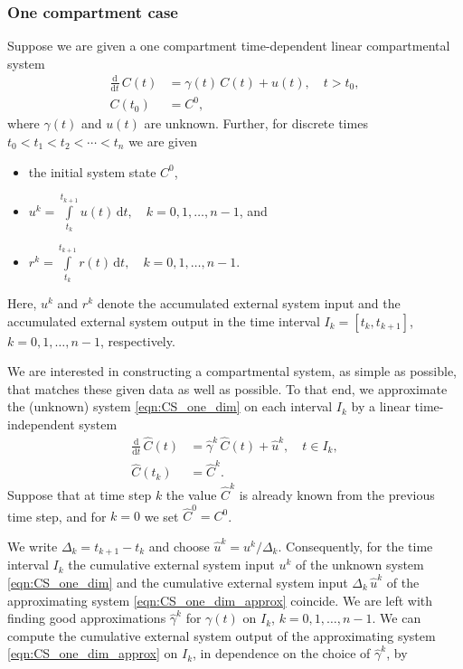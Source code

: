 \documentclass[draft]{agujournal2019}
\newcommand{\deriv}[1]{\frac{\mathrm{d}}{\mathrm{d}#1}}
\newcommand{\dd}[1]{\,\mathrm{d}#1}
\newcommand{\intl}{\int\limits}
\begin{document}
    \subsubsection{One compartment case}
        Suppose we are given a one compartment time-dependent linear compartmental system
        \begin{equation}\label{eqn:CS_one_dim}
            \begin{aligned}
                \deriv{t}\,C(t) &= \gamma(t)\,C(t) + u(t),\quad t>t_0,\\
                C(t_0) &= C^0,
            \end{aligned}
        \end{equation}
        where $\gamma(t)$ and $u(t)$ are unknown.
        Further, for discrete times $t_0<t_1<t_2<\cdots<t_n$ we are given
        \begin{itemize}
            \item the initial system state $C^0$,
            \item $u^k = \intl_{t_k}^{t_{k+1}} u(t)\dd{t},\quad k=0,1,\ldots,n-1$, and
            \item $r^k = \intl_{t_k}^{t_{k+1}} r(t)\dd{t},\quad k=0,1,\ldots,n-1$.
        \end{itemize}
        Here, $u^k$ and $r^k$ denote the accumulated external system input and the accumulated external system output in the time interval $I_k=[t_k,t_{k+1}]$, $k=0,1,\ldots,n-1$, respectively.

        We are interested in constructing a compartmental system, as simple as possible, that matches these given data as well as possible.
        To that end, we approximate the (unknown) system \eqref{eqn:CS_one_dim} on each interval $I_k$ by a linear time-independent system
        \begin{equation}\label{eqn:CS_one_dim_approx}
            \begin{aligned}
                \deriv{t}\,\widehat{C}(t) &= \widehat{\gamma}^k\,\widehat{C}(t) + \widehat{u}^k,\quad t\in I_k,\\
                \widehat{C}(t_k) &= \widehat{C}^k.
            \end{aligned}
        \end{equation}
        Suppose that at time step $k$ the value $\widehat{C}^k$ is already known from the previous time step,
        and for $k=0$ we set $\widehat{C}^0=C^0$.
        
        We write $\Delta_k=t_{k+1}-t_k$ and choose $\widehat{u}^k=u^k/\Delta_k$.
        Consequently, for the time interval $I_k$ the cumulative external system input $u^k$ of the unknown system \eqref{eqn:CS_one_dim} and the cumulative external system input $\Delta_k\,\widehat{u}^k$ of the approximating system \eqref{eqn:CS_one_dim_approx} coincide.
        We are left with finding good approximations $\widehat{\gamma}^k$ for $\gamma(t)$ on $I_k$, $k=0,1,\ldots,n-1$.
        We can compute the cumulative external system output of the approximating system \eqref{eqn:CS_one_dim_approx} on $I_k$, in dependence on the choice of $\widehat{\gamma}^k$, by
        
\end{document}
